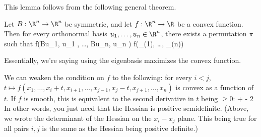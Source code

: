 This lemma follows from the following general theorem.
\begin{thm} %
Let $B: \R^n \to \R^n$ be symmetric, and let $f: \R^n \to \R$ be a convex function. Then for every orthonormal basis $u_1, \ldots, u_n \in \R^n$, there exists a permutation $\pi$ such that 
f(\langle Bu_1, u_1 \rangle, \ldots, \langle Bu_n, u_n \rangle) \leq f(\lambda_{\pi(1)}, \ldots, \lambda_{\pi(n)})
\eeq
\end{thm}
Essentially, we're saying using the eigenbasis maximizes the convex function. 
\begin{rem}
We can weaken the condition on $f$ to the following: 
for every $i < j$, $t \mapsto f(x_1, \ldots, x_i + t, x_{i + 1}, \ldots, x_{j - 1}, x_{j} - t, x_{j + 1}, \ldots, x_n)$ is convex as a function of $t$. 
If $f$ is smooth, this is equivalent to the second derivative in $t$ being $\ge 0$:
 +  - 2   
\eeq
In other words, you just need that the Hessian is positive semidefinite. (Above, we wrote the determinant of the Hessian on the $x_i-x_j$ plane. This being true for all pairs $i,j$ is the same as the Hessian being positive definite.) 
\end{rem}
